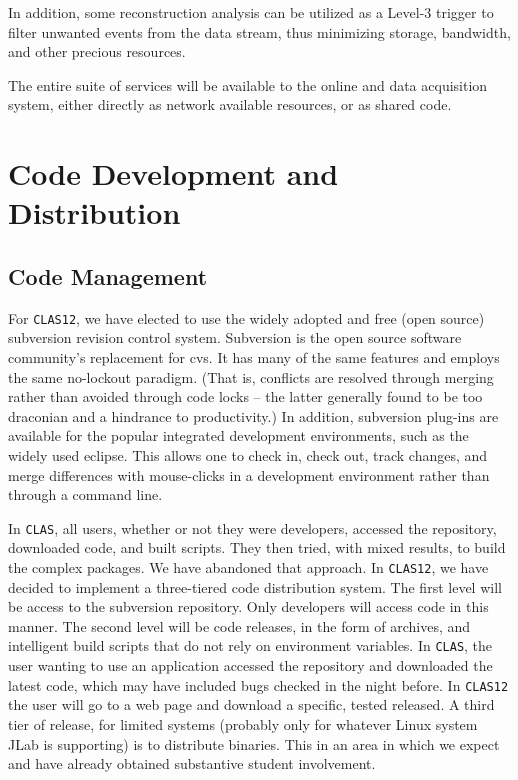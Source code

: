 In addition, some reconstruction analysis can be utilized as a Level-3 
trigger to filter unwanted events from the data stream, thus minimizing 
storage, bandwidth, and other precious resources.

The entire suite of services will be available to the online and data 
acquisition system, either directly as network available resources, or as 
shared code. 

\section{Code Development and Distribution}

\subsection{Code Management}

For {\tt CLAS12}, we have elected to use the widely adopted and free (open 
source) subversion revision control system. Subversion is the open source 
software community's replacement for cvs. It has many of the same features 
and employs the same no-lockout paradigm. (That is, conflicts are resolved 
through merging rather than avoided through code locks -- the latter 
generally found to be too draconian and a hindrance to productivity.) In 
addition, subversion plug-ins are available for the popular integrated 
development environments, such as the widely used eclipse. This allows one to 
check in, check out, track changes, and merge differences with mouse-clicks 
in a development environment rather than through a command line. 

In {\tt CLAS}, all users, whether or not they were developers, accessed the 
repository, downloaded code, and built scripts.  They then tried, with 
mixed results, to build the complex packages. We have abandoned that 
approach.  In {\tt CLAS12}, we have decided to implement a three-tiered code 
distribution system.  The first level will be access to the subversion 
repository. Only developers will access code in this manner. The second level 
will be code releases, in the form of archives, and intelligent build scripts 
that do not rely on environment variables. In {\tt CLAS}, the user wanting to 
use an application accessed the repository and downloaded the latest code, 
which may have included bugs checked in the night before. In {\tt CLAS12} the 
user will go to a web page and download a specific, tested released. A third 
tier of release, for limited systems (probably only for whatever Linux system 
JLab is supporting) is to distribute binaries.  This in an area in which we 
expect and have already obtained substantive student involvement.

